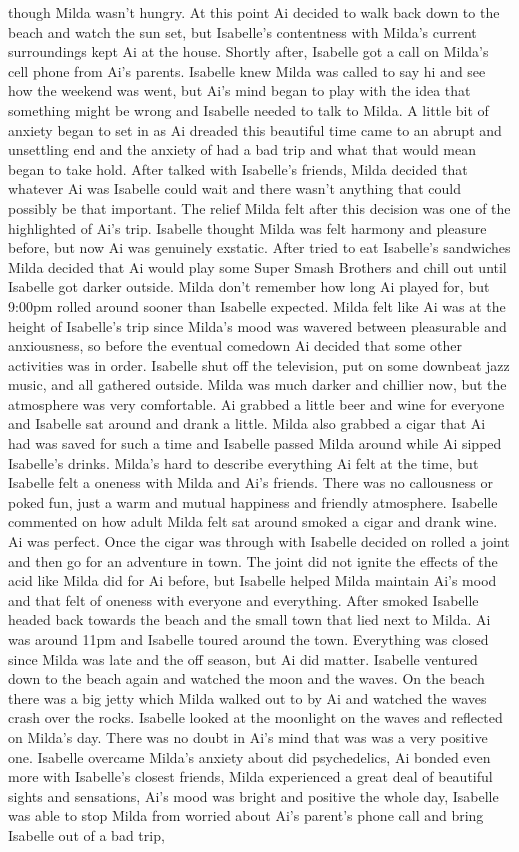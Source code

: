 \documentclass[12pt]{book}
\begin{document}
though Milda wasn't hungry. At this point Ai decided to walk back down to the beach and watch the sun set, but Isabelle's contentness with Milda's current surroundings kept Ai at the house. Shortly after, Isabelle got a call on Milda's cell phone from Ai's parents. Isabelle knew Milda was called to say hi and see how the weekend was went, but Ai's mind began to play with the idea that something might be wrong and Isabelle needed to talk to Milda. A little bit of anxiety began to set in as Ai dreaded this beautiful time came to an abrupt and unsettling end and the anxiety of had a bad trip and what that would mean began to take hold. After talked with Isabelle's friends, Milda decided that whatever Ai was Isabelle could wait and there wasn't anything that could possibly be that important. The relief Milda felt after this decision was one of the highlighted of Ai's trip. Isabelle thought Milda was felt harmony and pleasure before, but now Ai was genuinely exstatic. After tried to eat Isabelle's sandwiches Milda decided that Ai would play some Super Smash Brothers and chill out until Isabelle got darker outside. Milda don't remember how long Ai played for, but 9:00pm rolled around sooner than Isabelle expected. Milda felt like Ai was at the height of Isabelle's trip since Milda's mood was wavered between pleasurable and anxiousness, so before the eventual comedown Ai decided that some other activities was in order. Isabelle shut off the television, put on some downbeat jazz music, and all gathered outside. Milda was much darker and chillier now, but the atmosphere was very comfortable. Ai grabbed a little beer and wine for everyone and Isabelle sat around and drank a little. Milda also grabbed a cigar that Ai had was saved for such a time and Isabelle passed Milda around while Ai sipped Isabelle's drinks. Milda's hard to describe everything Ai felt at the time, but Isabelle felt a oneness with Milda and Ai's friends. There was no callousness or poked fun, just a warm and mutual happiness and friendly atmosphere. Isabelle commented on how adult Milda felt sat around smoked a cigar and drank wine. Ai was perfect. Once the cigar was through with Isabelle decided on rolled a joint and then go for an adventure in town. The joint did not ignite the effects of the acid like Milda did for Ai before, but Isabelle helped Milda maintain Ai's mood and that felt of oneness with everyone and everything. After smoked Isabelle headed back towards the beach and the small town that lied next to Milda. Ai was around 11pm and Isabelle toured around the town. Everything was closed since Milda was late and the off season, but Ai did matter. Isabelle ventured down to the beach again and watched the moon and the waves. On the beach there was a big jetty which Milda walked out to by Ai and watched the waves crash over the rocks. Isabelle looked at the moonlight on the waves and reflected on Milda's day. There was no doubt in Ai's mind that was was a very positive one. Isabelle overcame Milda's anxiety about did psychedelics, Ai bonded even more with Isabelle's closest friends, Milda experienced a great deal of beautiful sights and sensations, Ai's mood was bright and positive the whole day, Isabelle was able to stop Milda from worried about Ai's parent's phone call and bring Isabelle out of a bad trip, 
\end{document}
